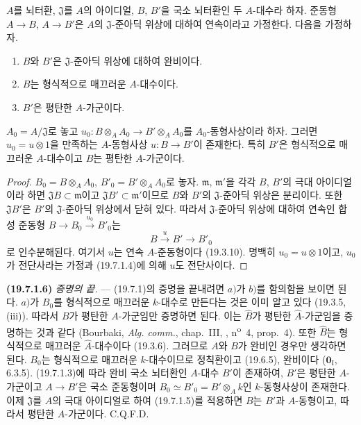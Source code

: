 \begin{lemma}[19.7.1.5]
\label{0.19.7.1.5-ko}
$A$를 뇌터환, $\mathfrak J$를 $A$의 아이디얼, $B$, $B'$을 국소
뇌터환인 두 $A$-대수라 하자. 준동형 $A\to B$, $A\to B'$은 $A$의
$\mathfrak J$-준아딕 위상에 대하여 연속이라고 가정한다. 다음을
가정하자.
\begin{enumerate}
  \item[$1^{\mathrm o}$] $B$와 $B'$은 $\mathfrak J$-준아딕 위상에
  대하여 완비이다.
  \item[$2^{\mathrm o}$] $B$는 형식적으로 매끄러운 $A$-대수이다.
  \item[$3^{\mathrm o}$] $B'$은 평탄한 $A$-가군이다.
\end{enumerate}
$A_0=A/\mathfrak J$로 놓고
$u_0:B\otimes_A A_0\to B'\otimes_A A_0$를 $A_0$-동형사상이라 하자.
그러면 $u_0=u\otimes1$을 만족하는 $A$-동형사상 $u:B\to B'$이
존재한다. 특히 $B'$은 형식적으로 매끄러운 $A$-대수이고 $B$는
평탄한 $A$-가군이다.
\end{lemma}

\begin{proof}
$B_0=B\otimes_A A_0$, $B'_0=B'\otimes_A A_0$로 놓자.
$\mathfrak m$, $\mathfrak m'$을 각각 $B$, $B'$의 극대 아이디얼이라
하면 $\mathfrak JB\subset\mathfrak m$이고
$\mathfrak JB'\subset\mathfrak m'$이므로 $B$와 $B'$의
$\mathfrak J$-준아딕 위상은 분리이다. 또한 $\mathfrak JB'$은
$B'$의 $\mathfrak J$-준아딕 위상에서 닫혀 있다. 따라서
$\mathfrak J$-준아딕 위상에 대하여 연속인 합성 준동형
$B\to B_0\xrightarrow{u_0}B'_0$는
\[
  B\xrightarrow{u}B'\longrightarrow B'_0
\]
로 인수분해된다. 여기서 $u$는 연속 $A$-준동형이다 (19.3.10).
명백히 $u_0=u\otimes1$이고, $u_0$가 전단사라는 가정과 (19.7.1.4)에
의해 $u$도 전단사이다.
\end{proof}

\medskip
\noindent{}\label{0.19.7.1.6-ko}\textbf{(19.7.1.6)}\enspace
\emph{증명의 끝.} --- (19.7.1)의 증명을 끝내려면 $a)$가 $b)$를
함의함을 보이면 된다. $a)$가 $B_0$를 형식적으로 매끄러운
$k$-대수로 만든다는 것은 이미 알고 있다 (19.3.5, (iii)). 따라서
$B$가 평탄한 $A$-가군임만 증명하면 된다. 이는 $\widehat B$가 평탄한
$\widehat A$-가군임을 증명하는 것과 같다 (Bourbaki,
\emph{Alg. comm.}, chap.~III, , n\textsuperscript{o}~4,
prop.~4). 또한 $\widehat B$는 형식적으로 매끄러운 $\widehat A$-대수이다
(19.3.6). 그러므로 $A$와 $B$가 완비인 경우만 생각하면 된다.
$B_0$는 형식적으로 매끄러운 $k$-대수이므로 정칙환이고 (19.6.5),
완비이다 ($\mathbf 0_{\mathrm I}$, 6.3.5). (19.7.1.3)에 따라 완비
국소 뇌터환인 $A$-대수 $B'$이 존재하여, $B'$은 평탄한 $A$-가군이고
$A\to B'$은 국소 준동형이며
$B_0\simeq B'_0=B'\otimes_A k$인 $k$-동형사상이 존재한다. 이제
$\mathfrak J$를 $A$의 극대 아이디얼로 하여 (19.7.1.5)를 적용하면
$B$는 $B'$과 $A$-동형이고, 따라서 평탄한 $A$-가군이다. C.Q.F.D.

